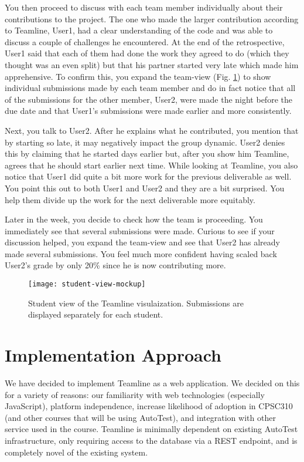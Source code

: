 \documentclass[preprint,journal]{vgtc}       %
\begin{document}
You then proceed to discuss with each team member individually about their contributions
to the project. The one who made the larger contribution according to Teamline, User1,
had a clear understanding of the code and was able to discuss a couple of challenges
he encountered. At the end of the retrospective, User1 said that each of them had
done the work they agreed to do (which they thought was an even split) but that
his partner started very late which made him apprehensive.
To confirm this, you expand the team-view (Fig. \ref{fig:studentview}) to show individual submissions made by
each team member and do in fact notice that all of the submissions for the other
member, User2, were made the night before the due date and that User1's submissions were
made earlier and more consistently.

Next, you talk to User2. After he explains what he contributed, you mention that by
starting so late, it may negatively impact the group dynamic. User2 denies this by claiming
that he started days earlier but, after you show him Teamline, agrees that he should
start earlier next time. While looking at Teamline, you also notice that User1 did
quite a bit more work for the previous deliverable as well. You point this out to
both User1 and User2 and they are a bit surprised. You help them divide up the work
for the next deliverable more equitably.

Later in the week, you decide to check how the team is proceeding. You immediately
see that several submissions were made. Curious to see if your discussion helped,
you expand the team-view and see that User2 has already made several submissions.
You feel much more confident having scaled back User2's grade by only 20\% since he
is now contributing more.

\begin{figure}[h]
  \centering
  \texttt{[image: student-view-mockup]}
  \caption{Student view of the Teamline visulaization. Submissions are displayed
   separately for each student.}
  \label{fig:studentview}
\end{figure}


\section{Implementation Approach}
We have decided to implement Teamline as a web application. We decided on this for
a variety of reasons: our familiarity with web technologies (especially JavaScript), platform independence,
increase likelihood of adoption in CPSC310 (and other courses that will be using AutoTest),
and integration with other service used in the course. Teamline is minimally dependent
on existing AutoTest infrastructure, only requiring access to the database via a
REST endpoint, and is completely novel of the existing system.
\end{document}
